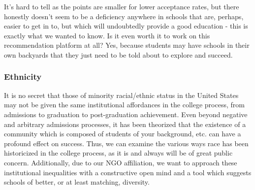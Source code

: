 \documentclass{article}\usepackage[]{graphicx}\usepackage[]{color}
\begin{document}
It's hard to tell as the points are smaller for lower acceptance rates, but there honestly doesn't seem to be a deficiency anywhere in schools that are, perhaps, easier to get in to, but which will undoubtedly provide a good education - this is exactly what we wanted to know. Is it even worth it to work on this recommendation platform at all? Yes, because students may have schools in their own backyards that they just need to be told about to explore and succeed. 

\subsubsection{Ethnicity}

It is no secret that those of minority racial/ethnic status in the United States may not be given the same institutional affordances in the college process, from admissions to graduation to post-graduation achievement. Even beyond negative and arbitrary admissions processes, it has been theorized that the existence of a community which is composed of students of your background, etc. can have a profound effect on success. Thus, we can examine the various ways race has been historicized in the college process, as it is and always will be of great public concern. Additionally, due to our NGO affiliation, we want to approach these institutional inequalities with a constructive open mind and a tool which suggests schools of better, or at least matching, diversity. 
\end{document}
